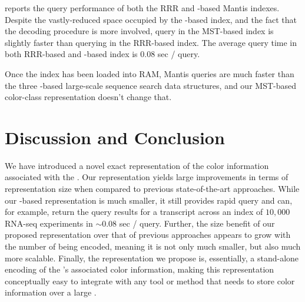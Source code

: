  reports the query performance of both the RRR
and \mst-based Mantis indexes. Despite the vastly-reduced space occupied by the
\mst-based index, and the fact that the \cc decoding procedure is more involved,
query in the MST-based index is slightly faster than querying in the RRR-based index.
The average query time in both RRR-based and \mst-based index
is $0.08$ sec / query.

Once the index has been loaded into RAM, Mantis queries are much faster than the
three \sbt-based large-scale sequence search data structures, and our MST-based
color-class representation doesn't change that.

%
\section{Discussion and Conclusion}
\label{sec:mantis_conclusion}

We have introduced a novel exact representation of the color
information associated with the \cdbg. Our representation yields large
improvements in terms of representation size when compared to previous
state-of-the-art approaches. While our \mst-based representation is
much smaller, it still provides rapid query and can, for example,
return the query results for a transcript across an index of $10,000$
RNA-seq experiments in $\sim{0.08}$ sec / query. Further, the size
benefit of our proposed representation over that of previous approaches
appears to grow with the number of \ccs being encoded, meaning it is
not only much smaller, but also much more scalable. Finally, the
representation we propose is, essentially, a stand-alone encoding of
the \cdbg's associated color information, making this representation
conceptually easy to integrate with any tool or method that needs to
store color information over a large \dbg.

